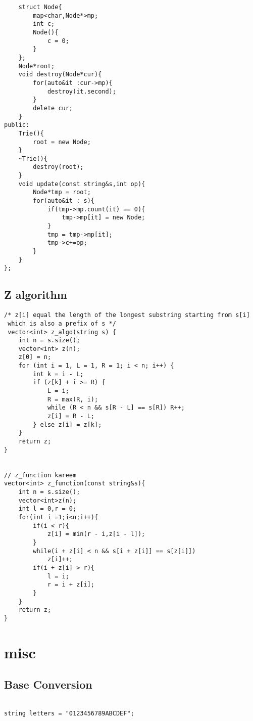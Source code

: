 \documentclass{article}
\begin{document}
{\begin{verbatim}
    struct Node{
        map<char,Node*>mp;
        int c;
        Node(){
            c = 0;
        }
    };
    Node*root;
    void destroy(Node*cur){
        for(auto&it :cur->mp){
            destroy(it.second);
        }
        delete cur;
    }
public:
    Trie(){
        root = new Node;
    }
    ~Trie(){
        destroy(root);
    }
    void update(const string&s,int op){
        Node*tmp = root;
        for(auto&it : s){
            if(tmp->mp.count(it) == 0){
                tmp->mp[it] = new Node;
            }
            tmp = tmp->mp[it];
            tmp->c+=op;
        }
    }
};

\end{verbatim}

\subsection{Z algorithm}
\begin{verbatim}
/* z[i] equal the length of the longest substring starting from s[i]  
 which is also a prefix of s */
 vector<int> z_algo(string s) {  
    int n = s.size();  
    vector<int> z(n);  
    z[0] = n;  
    for (int i = 1, L = 1, R = 1; i < n; i++) {  
        int k = i - L;  
        if (z[k] + i >= R) {  
            L = i;  
            R = max(R, i);  
            while (R < n && s[R - L] == s[R]) R++;  
            z[i] = R - L;  
        } else z[i] = z[k];  
    }  
    return z;  
}


// z_function kareem
vector<int> z_function(const string&s){
    int n = s.size();
    vector<int>z(n);
    int l = 0,r = 0;
    for(int i =1;i<n;i++){
        if(i < r){
            z[i] = min(r - i,z[i - l]);
        }
        while(i + z[i] < n && s[i + z[i]] == s[z[i]])
            z[i]++;
        if(i + z[i] > r){
            l = i;
            r = i + z[i];
        }
    }
    return z;
}
\end{verbatim}

\section{misc}

\subsection{Base Conversion}
\begin{verbatim}
  
string letters = "0123456789ABCDEF";  
  

\end{verbatim}}
\end{document}
